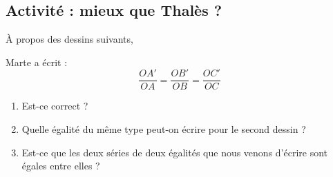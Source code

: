 
\subsection*{Activité : mieux que Thalès ?}

À propos des dessins suivants,
\begin{center}
   
   
\end{center}
Marte a écrit :
\begin{equation}
    \frac{ OA' }{ OA }=\frac{ OB' }{ OB }=\frac{ OC' }{ OC }
\end{equation}

\begin{enumerate}
    \item
        
Est-ce correct ?
\item
Quelle égalité du même type peut-on écrire pour le second dessin ?
\item
    Est-ce que les deux séries de deux égalités que nous venons d'écrire sont égales entre elles ?
\end{enumerate}
